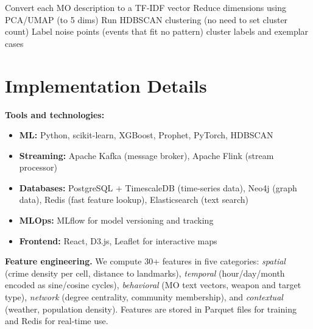 \documentclass[a4paper,10pt,twocolumn]{article}
\begin{document}
\begin{algorithm}[H]
\SetAlgoLined
{}
Convert each MO description to a TF-IDF vector\;
Reduce dimensions using PCA/UMAP (to 5 dims)\;
Run HDBSCAN clustering (no need to set cluster count)\;
Label noise points (events that fit no pattern)\;
\Return cluster labels and exemplar cases\;
\caption{MO Clustering via HDBSCAN}
\label{alg:mo}
\end{algorithm}

\begin{algorithm}[H]
\SetAlgoLined
{}
\caption{Real-Time Threat Detection}
\label{alg:rt}
\end{algorithm}

\section{Implementation Details}

\textbf{Tools and technologies:}
\begin{itemize}
  \item \textbf{ML:} Python, scikit-learn, XGBoost, Prophet, PyTorch, HDBSCAN
  \item \textbf{Streaming:} Apache Kafka (message broker), Apache Flink (stream processor)
  \item \textbf{Databases:} PostgreSQL + TimescaleDB (time-series data), Neo4j (graph data), Redis (fast feature lookup), Elasticsearch (text search)
  \item \textbf{MLOps:} MLflow for model versioning and tracking
  \item \textbf{Frontend:} React, D3.js, Leaflet for interactive maps
\end{itemize}

\textbf{Feature engineering.} We compute 30+ features in five categories: \emph{spatial} (crime density per cell, distance to landmarks), \emph{temporal} (hour/day/month encoded as sine/cosine cycles), \emph{behavioral} (MO text vectors, weapon and target type), \emph{network} (degree centrality, community membership), and \emph{contextual} (weather, population density). Features are stored in Parquet files for training and Redis for real-time use.
\end{document}
